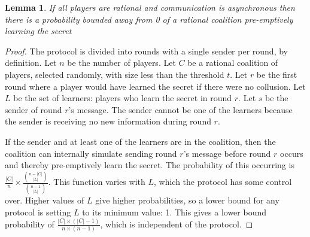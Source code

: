 \documentclass{dalcsthesis}
\newtheorem{lemma}{Lemma}
\begin{document}
\begin{lemma} If all players are rational and communication is asynchronous then there is a probability bounded away from 0 of a rational coalition pre-emptively learning the secret \label{Lem:Async:CoalitionsMayPreempt} \end{lemma}
\begin{proof}
The protocol is divided into rounds with a single sender per round, by definition. 
Let $n$ be the number of players.
Let $C$ be a rational coalition of players, selected randomly, with size less than the threshold $t$.
Let $r$ be the first round where a player would have learned the secret if there were no collusion.
Let $L$ be the set of learners: players who learn the secret in round $r$.
Let $s$ be the sender of round $r$'s message.
The sender cannot be one of the learners because the sender is receiving no new information during round $r$.

If the sender and at least one of the learners are in the coalition, then the coalition can internally simulate sending round $r$'s message before round $r$ occurs and thereby pre-emptively learn the secret. The probability of this occurring is $\frac{|C|}{n} \times \frac{\binom{n - |C|}{|L|}}{\binom{n - 1}{|L|}}$. This function varies with $L$, which the protocol has some control over. Higher values of $L$ give higher probabilities, so a lower bound for any protocol is setting $L$ to its minimum value: 1. This gives a lower bound probability of $\frac{|C| \times (|C| - 1)}{n \times (n-1)}$, which is independent of the protocol.
\end{proof}
\end{document}
